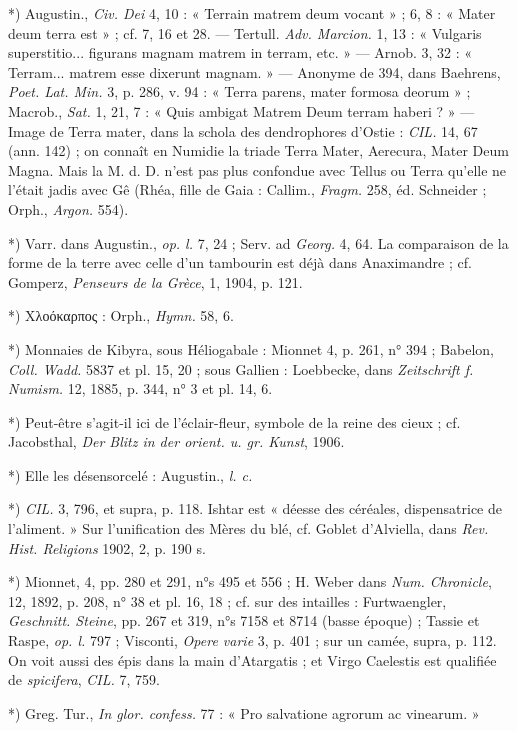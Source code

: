 \documentclass[a4paper, 11pt, oneside, polutonikogreek, french]{article}
\begin{document}
*) Augustin., \emph{Civ. Dei} 4, 10 : « Terrain matrem deum vocant » ; 6, 8 : « Mater deum terra est » ; cf. 7, 16 et 28. --- Tertull. \emph{Adv. Marcion.} 1, 13 : « Vulgaris superstitio... figurans magnam matrem in terram, etc. » --- Arnob. 3, 32 : « Terram... matrem esse dixerunt magnam. » --- Anonyme de 394, dans Baehrens, \emph{Poet. Lat. Min.} 3, p. 286, v. 94 : « Terra parens, mater formosa deorum » ; Macrob., \emph{Sat.} 1, 21, 7 : « Quis ambigat Matrem Deum terram haberi ? » --- Image de Terra mater, dans la schola des dendrophores d'Ostie : \emph{CIL.} 14, 67 (ann. 142) ; on connaît en Numidie la triade Terra Mater, Aerecura, Mater Deum Magna. Mais la M. d. D. n'est pas plus confondue avec Tellus ou Terra qu'elle ne l'était jadis avec Gê (Rhéa, fille de Gaia : Callim., \emph{Fragm.} 258, éd. Schneider ; Orph., \emph{Argon.} 554).

*) Varr. dans Augustin., \emph{op. l.} 7, 24 ; Serv. ad \emph{Georg.} 4, 64. La comparaison de la forme de la terre avec celle d'un tambourin est déjà dans Anaximandre ; cf. Gomperz, \emph{Penseurs de la Grèce}, 1, 1904, p. 121.

*) Χλοόκαρπος : Orph., \emph{Hymn.} 58, 6.

*) Monnaies de Kibyra, sous Héliogabale : Mionnet 4, p. 261, n° 394 ; Babelon, \emph{Coll. Wadd.} 5837 et pl. 15, 20 ; sous Gallien : Loebbecke, dans \emph{Zeitschrift f. Numism.} 12, 1885, p. 344, n° 3 et pl. 14, 6.

*) Peut-être s'agit-il ici de l'éclair-fleur, symbole de la reine des cieux ; cf. Jacobsthal, \emph{Der Blitz in der orient. u. gr. Kunst}, 1906.

*) Elle les désensorcelé : Augustin., \emph{l. c.}

*) \emph{CIL.} 3, 796, et supra, p. 118. Ishtar est « déesse des céréales, dispensatrice de l'aliment. » Sur l'unification des Mères du blé, cf. Goblet d'Alviella, dans \emph{Rev. Hist. Religions} 1902, 2, p. 190 s.

*) Mionnet, 4, pp. 280 et 291, n°s 495 et 556 ; H. Weber dans \emph{Num. Chronicle}, 12, 1892, p. 208, n° 38 et pl. 16, 18 ; cf. sur des intailles : Furtwaengler, \emph{Geschnitt. Steine}, pp. 267 et 319, n°s 7158 et 8714 (basse époque) ; Tassie et Raspe, \emph{op. l.} 797 ; Visconti, \emph{Opere varie} 3, p. 401 ; sur un camée, supra, p. 112. On voit aussi des épis dans la main d'Atargatis ; et Virgo Caelestis est qualifiée de \emph{spicifera}, \emph{CIL.} 7, 759.

*) Greg. Tur., \emph{In glor. confess.} 77 : « Pro salvatione agrorum ac vinearum. »
\end{document}
